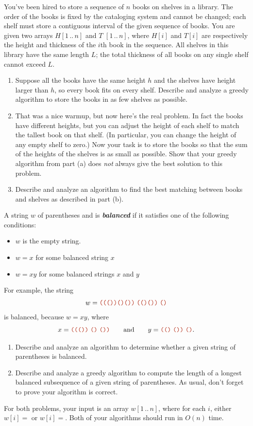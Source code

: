 \begin{exercises}
\item You’ve been hired to store a sequence of $n$ books on shelves in a library. The order of the books is fixed by the cataloging system and cannot be changed; each shelf must store a contiguous interval of the given sequence of books. You are given two arrays $H[1\,..\,n]$ and $T$ $[1\,..\,n]$, where $H[i]$ and $T[i]$ are respectively the height and thickness of the $i$th book in the sequence. All shelves in this library have the same length $L$; the total thickness of all books on any single shelf cannot exceed $L$.
\begin{enumerate}[label=(\alph*)]
\item Suppose all the books have the same height $h$ and the shelves have height larger than $h$, so every book fits on every shelf. Describe and analyze a greedy algorithm to store the books in as few shelves as possible. 
\item That was a nice warmup, but now here’s the real problem. In fact the books have different heights, but you can adjust the height of each shelf to match the tallest book on that shelf. (In particular, you can change the height of any empty shelf to zero.) Now your task is to store the books so that the sum of the heights of the shelves is as small as possible. Show that your greedy algorithm from part (a) does \textit{not} always give the best solution to this problem.
\item Describe and analyze an algorithm to find the best matching between books and shelves as described in part (b).
\end{enumerate}

\item A string $w$ of parentheses \Str{(} and \Str{)} is \textbf{\textit{balanced}} if it satisfies one of the following conditions:
\begin{itemize}
\item $w$ is the empty string.
\item $w =$\Str{ (}$x$\Str{)} for some balanced string $x$
\item $w = x y$ for some balanced strings $x$ and $y$
\end{itemize}
For example, the string
\[
w = \mbox{\Str{((())()())}} \; \mbox{\Str{(()())}} \; \mbox{\Str{()}}
\]
is balanced, because $w = x y$, where
\[
x = \mbox{\Str{((())}} \; \mbox{\Str{()}} \; \mbox{\Str{())}}
\qquad \text{and} \qquad
y = \mbox{\Str{(()}} \; \mbox{\Str{())}} \; \mbox{\Str{()}}.
\]
\begin{enumerate}[label=(\alph*)]
\item Describe and analyze an algorithm to determine whether a given string of parentheses is balanced.
\item Describe and analyze a greedy algorithm to compute the length of a longest balanced subsequence of a given string of parentheses. As usual, don’t forget to prove your algorithm is correct.
\end{enumerate}
For both problems, your input is an array $w[1\,..\,n]$, where for each $i$, either $w[i] =$\Str{ (} or $w[i] =$\Str{ )}. Both of your algorithms should run in $O(n)$ time.


\end{exercises}
